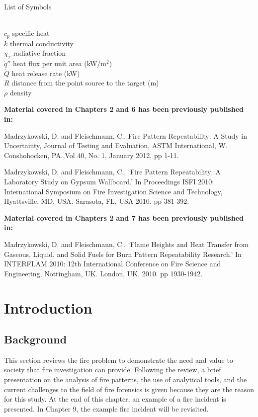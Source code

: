 \documentclass[twoside]{uocthesis}
\begin{document}
\clearpage

List of Symbols
\begin{tabbing}
\hspace{1.5in} \= \\
$c_{p}$ \> specific heat \\
$k$ \> thermal conductivity \\
$\chi_r$ \> radiative fraction \\
$\dot{q}''$ \> heat flux per unit area (kW/m$^2$) \\
$\dot{Q}$ \> heat release rate (kW) \\ 
$R$ \> distance from the point source to the target (m) \\
$\rho$ \> density \\
\end{tabbing}


\textbf{Material covered in Chapters 2 and 6 has been previously published in:}   

Madrzykowski, D. and Fleischmann, C., Fire Pattern Repeatability: A Study in Uncertainty, Journal of
Testing and Evaluation, ASTM International, W. Conshohocken, PA.,Vol 40, No. 1, January 2012, pp 1-11.

Madrzykowski, D. and Fleischmann, C., `Fire Pattern Repeatability: A Laboratory Study on Gypsum Wallboard.' In Proceedings ISFI 2010: International Symposium on Fire Investigation Science and Technology, Hyattsville, MD, USA. Sarasota, FL, USA 2010. pp 381-392.

\textbf{Material covered in Chapters 2 and 7 has been previously published in:} 

Madrzykowski, D. and Fleischmann, C., `Flame Heights and Heat Transfer from Gaseous, Liquid, and Solid Fuels for Burn Pattern Repeatability Research.' In INTERFLAM 2010: 12th International Conference on Fire Science and Engineering, Nottingham, UK. London, UK, 2010. pp 1930-1942.



\textpages

\chapter{Introduction}
\label{chapter:Introduction}
\section{Background}

This section reviews the fire problem to demonstrate the need and value to society that fire investigation can provide. Following the review, a brief presentation on the analysis  of fire patterns, the use of analytical tools, and the current challenges to the field of fire forensics is given because they are the reason for this study.  At the end of this chapter, an example of a fire incident is presented. In Chapter 9, the example fire incident will be revisited.   
\end{document}
